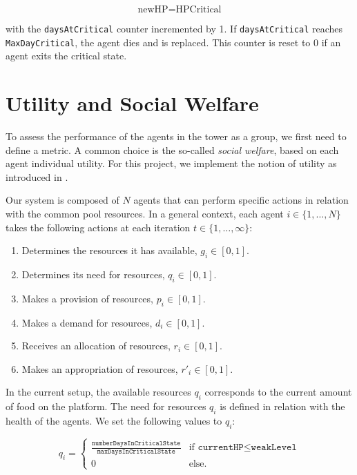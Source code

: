 \begin{equation}\label{hpDecay_critical_stay}
    \text{newHP} = \text{HPCritical}
\end{equation}

with the \texttt{daysAtCritical} counter incremented by 1. If \texttt{daysAtCritical} reaches \texttt{MaxDayCritical}, the agent dies and is replaced. This counter is reset to 0 if an agent exits the critical state.




\section{Utility and Social Welfare}\label{utility}

To assess the performance of the agents in the tower as a group, we first need to define a metric. A common choice is the so-called \emph{social welfare}, based on each agent individual utility. For this project, we implement the notion of utility as introduced in \cite{somasPitt}.

Our system is composed of $N$ agents that can perform specific actions in relation with the common pool resources. In a general context, each agent 
$i\in\{1, \ldots, N\}$ takes the following actions at each iteration $t\in\{1,\ldots,\infty\}$:

\begin{enumerate}
    \item Determines the resources it has available, $g_i \in [0,1]$.
    \item Determines its need for resources, $q_i \in [0,1]$.
    \item Makes a provision of resources, $p_i \in [0,1]$.
    \item Makes a demand for resources, $d_i \in [0,1]$.
    \item Receives an allocation of resources, $r_i \in [0,1]$.
    \item Makes an appropriation of resources, $r'_i \in [0,1]$.
\end{enumerate}

In the current setup, the available resources $q_i$ corresponds to the current amount of food on the platform.  The need for resources $q_i$ is defined in relation with the health of the agents. We set the following values to $q_i$:

\begin{equation}\label{resources_needed}
    q_i=\begin{cases}
     \frac{\texttt{numberDaysInCriticalState}}{\texttt{maxDaysInCriticalState}} & \mbox{if } \texttt{currentHP}\leq \texttt{weakLevel}  \\ 
     0 & \mbox{else.}
     \end{cases}
\end{equation}

